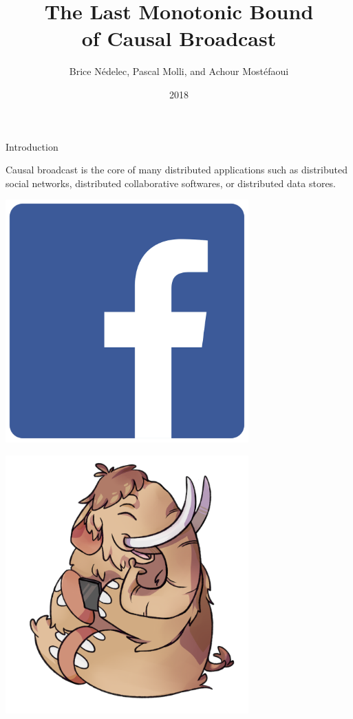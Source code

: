\documentclass[10pt, xcolor={usenames, dvipsnames}]{beamer}
\title{The Last Monotonic Bound\\of Causal Broadcast}
\author{Brice N\'edelec, Pascal Molli, and Achour Most{\'e}faoui}
\date{2018}
\institute{University of Nantes, LS2N}
\begin{document}
\maketitle

\begin{frame}{Introduction}

  Causal broadcast is the core of many distributed applications such as
  distributed social networks, distributed collaborative softwares, or
  distributed data stores.

  \vspace{3em}
  
    \begin{minipage}{0.19\textwidth}
      \centering
      \includegraphics[width=0.7\textwidth]{logos/facebook.png}
    \end{minipage}
    \begin{minipage}{0.19\textwidth}
      \centering
      \includegraphics[width=0.7\textwidth]{logos/mastodon.png}

\end{minipage}
\end{frame}
\end{document}
